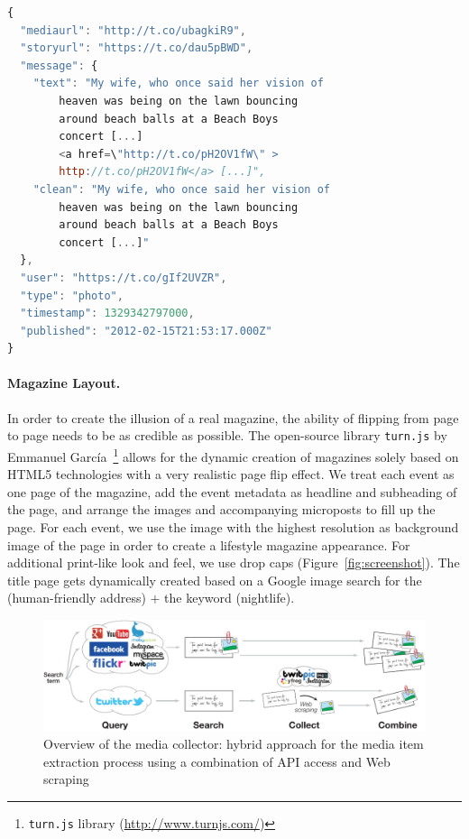 \documentclass[runningheads,a4paper]{llncs}
\begin{document}
{\begin{lstlisting}[language=JavaScript,caption={Sample output of the media collector showing a Google+ post},label={lst:media}]
{
  "mediaurl": "http://t.co/ubagkiR9",
  "storyurl": "https://t.co/dau5pBWD",
  "message": {
    "text": "My wife, who once said her vision of
        heaven was being on the lawn bouncing
        around beach balls at a Beach Boys
        concert [...]
        <a href=\"http://t.co/pH2OV1fW\" >
        http://t.co/pH2OV1fW</a> [...]",
    "clean": "My wife, who once said her vision of
        heaven was being on the lawn bouncing
        around beach balls at a Beach Boys
        concert [...]"
  },
  "user": "https://t.co/gIf2UVZR",
  "type": "photo",
  "timestamp": 1329342797000,
  "published": "2012-02-15T21:53:17.000Z"
}
\end{lstlisting}

\paragraph{Magazine Layout.} In order to create the illusion of a real magazine, the ability of flipping from page to page needs to be as credible as possible. The open-source library \texttt{turn.js} by Emmanuel García~\footnote{\texttt{turn.js} library (\url{http://www.turnjs.com/})} allows for the dynamic creation of magazines solely based on HTML5 technologies with a very realistic page flip effect. We treat each event as one page of the magazine, add the event metadata as headline and subheading of the page, and arrange the images and accompanying microposts to fill up the page. For each event, we use the image with the highest resolution as background image of the page in order to create a lifestyle magazine appearance. For additional print-like look and feel, we use drop caps (Figure~\ref{fig:screenshot}). The title page gets dynamically created based on a Google image search for the (human-friendly address) $+$ the keyword (nightlife).
\begin{figure}[htb!]
\centering
\includegraphics[width=0.6\linewidth]{./architecture.pdf}
\caption{Overview of the media collector: hybrid approach for the media item extraction process using a combination of API access and Web scraping}
\label{fig:architecture}
\end{figure}
\begin{figure}[htbp]
\centering

\end{figure}}
\end{document}
